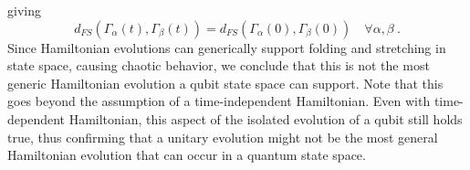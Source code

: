 \documentclass[%
 reprint,
 superscriptaddress,
 aps,
 pra,
]{revtex4-2}
\newcommand{\p}{\partial}
\theoremstyle{definition}
\begin{document}
giving
\begin{equation}
d_{FS}(\Gamma_\alpha(t),\Gamma_\beta(t))=d_{FS}(\Gamma_\alpha(0),\Gamma_\beta(0)) \quad \forall \alpha,\beta~.\label{eq:nochaos}
\end{equation}
Since Hamiltonian evolutions can generically support folding and stretching 
in state space, causing chaotic behavior, we conclude that this is not the 
most generic Hamiltonian evolution a qubit state space can support. Note
that this goes beyond the assumption of a time-independent Hamiltonian.
Even with time-dependent Hamiltonian, this aspect of the isolated evolution
of a qubit still holds true, thus confirming that a unitary evolution might not be
the most general Hamiltonian evolution that can occur in a quantum state space.




%


\end{document}
